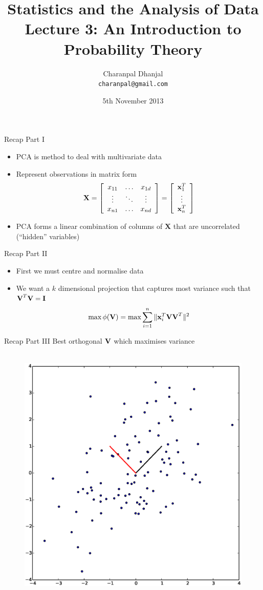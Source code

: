 \documentclass{beamer}
\title{Statistics and the Analysis of Data\\ Lecture 3: An Introduction to Probability Theory}
\author{Charanpal Dhanjal \\ \texttt{charanpal@gmail.com}}
\institute{\'{E}cole des Ponts}
\date{5th November 2013}
\begin{document}
\frame{\titlepage}


\begin{frame}{Recap Part I}  
\begin{itemize} 
\item PCA is method to deal with multivariate data 
\item Represent observations in matrix form 
\begin{displaymath} 
 \textbf{X} = \left[\begin{array}{c c c} x_{11} & \ldots & x_{1d} \\ 
                     \vdots & \ddots & \vdots \\
 x_{n1} & \ldots & x_{nd}  \end{array} \right]  = \left[\begin{array}{c} \textbf{x}_1^T \\ \vdots \\  \textbf{x}_n^T \end{array} \right]
\end{displaymath}
\item PCA forms a linear combination of columns of $\textbf{X}$ that are uncorrelated (``hidden'' variables)
\end{itemize}
\end{frame}


\begin{frame}{Recap Part II}
\begin{itemize} 
 \item First we must centre and normalise data 
\item We want a $k$ dimensional projection that captures most variance such that $\textbf{V}^T\textbf{V} = \textbf{I}$
 \begin{displaymath}
  \max \phi(\textbf{V}) = \max \sum_{i=1}^n \|\textbf{x}_{i}^T\textbf{V}\textbf{V}^T \|^2
 \end{displaymath}
\end{itemize}
\end{frame}

\begin{frame}{Recap Part III} 
Best orthogonal $\textbf{V}$ which maximises variance 
  \begin{figure}[htp]
\mbox{
\includegraphics[width=0.5\linewidth]{PCA.eps}
}
\end{figure} 
\end{frame}
\end{document}
